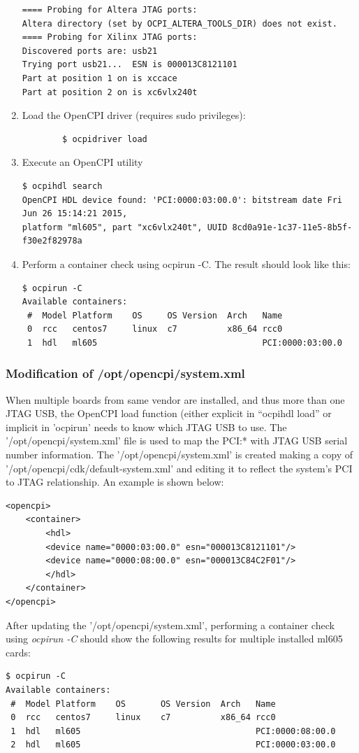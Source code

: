 \begin{enumerate}
\begin{verbatim}
==== Probing for Altera JTAG ports:
Altera directory (set by OCPI_ALTERA_TOOLS_DIR) does not exist.
==== Probing for Xilinx JTAG ports:
Discovered ports are: usb21
Trying port usb21...  ESN is 000013C8121101
Part at position 1 on is xccace
Part at position 2 on is xc6vlx240t
	\end{verbatim}\par\smallskip
	\item Load the OpenCPI driver (requires sudo privileges):\smallskip
	\begin{verbatim}
		$ ocpidriver load
	\end{verbatim}
	\item Execute an OpenCPI utility\smallskip
	\begin{verbatim}
$ ocpihdl search
OpenCPI HDL device found: 'PCI:0000:03:00.0': bitstream date Fri Jun 26 15:14:21 2015,
platform "ml605", part "xc6vlx240t", UUID 8cd0a91e-1c37-11e5-8b5f-f30e2f82978a
	\end{verbatim}
	\item Perform a container check using ocpirun -C. The result
	should look like this:\smallskip
	\begin{verbatim}
$ ocpirun -C
Available containers:
 #  Model Platform    OS     OS Version  Arch   Name
 0  rcc   centos7     linux  c7          x86_64 rcc0
 1  hdl   ml605                                 PCI:0000:03:00.0
  	\end{verbatim}
\end{enumerate}

\subsubsection{Modification of /opt/opencpi/system.xml}
When multiple boards from same vendor are installed, and thus more than one JTAG USB, the OpenCPI load function (either explicit in ``ocpihdl load'' or implicit in 'ocpirun' needs to know which JTAG USB to use. The '/opt/opencpi/system.xml' file is used to map the PCI:* with JTAG USB serial number information. The '/opt/opencpi/system.xml' is created making a copy of '/opt/opencpi/cdk/default-system.xml' and editing it to reflect the system's PCI to JTAG relationship.
An example is shown below:
	\begin{verbatim}
<opencpi>
    <container>
        <hdl>
        <device name="0000:03:00.0" esn="000013C8121101"/>
        <device name="0000:08:00.0" esn="000013C84C2F01"/>
        </hdl>
    </container>
</opencpi>
	\end{verbatim}
After updating the '/opt/opencpi/system.xml', performing a container check using \textit{ocpirun -C} should show the following results for multiple installed ml605 cards:
	\begin{verbatim}
$ ocpirun -C
Available containers:
 #  Model Platform    OS       OS Version  Arch   Name
 0  rcc   centos7     linux    c7          x86_64 rcc0
 1  hdl   ml605                                   PCI:0000:08:00.0
 2  hdl   ml605                                   PCI:0000:03:00.0
	\end{verbatim}



